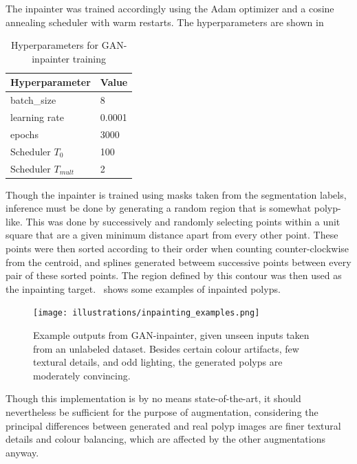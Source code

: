 The inpainter was trained accordingly using the Adam optimizer and a cosine annealing scheduler with warm restarts. The hyperparameters are shown in~
\begin{table}[htb]
    \centering
\begin{tabularx}{\linewidth}{@{}XX@{}}
    \toprule
     Hyperparameter & Value \\
     \midrule
     batch\_size & 8 \\
     learning rate & 0.0001 \\
     epochs & 3000 \\
     Scheduler \(T_0\) & 100\\
     Scheduler \(T_{mult}\) & 2 \\
     \bottomrule
\end{tabularx}
    \caption{Hyperparameters for GAN-inpainter training}
    \label{tab:inpainting_hyperparameters}
\end{table}

Though the inpainter is trained using masks taken from the segmentation labels, inference must be done by generating a random region that is somewhat polyp-like. This was done by successively and randomly selecting points within a unit square that are a given minimum distance apart from every other point. These points were then sorted according to their order when counting counter-clockwise from the centroid, and splines generated betweem successive points between every pair of these sorted points. The region defined by this contour was then used as the inpainting target.~ shows some examples of inpainted polyps. 

\begin{figure}[!th]
    \centering
    \texttt{[image: illustrations/inpainting\_examples.png]} 
    \caption[GAN-inpainter rexamples]{Example outputs from GAN-inpainter, given unseen inputs taken from an unlabeled dataset. Besides certain colour artifacts, few textural details, and odd lighting, the generated polyps are moderately convincing.}
    \label{fig:inpaint}
\end{figure}


Though this implementation is by no means state-of-the-art, it should nevertheless be sufficient for the purpose of augmentation, considering the principal differences between generated and real polyp images are finer textural details and colour balancing, which are affected by the other augmentations anyway. 


